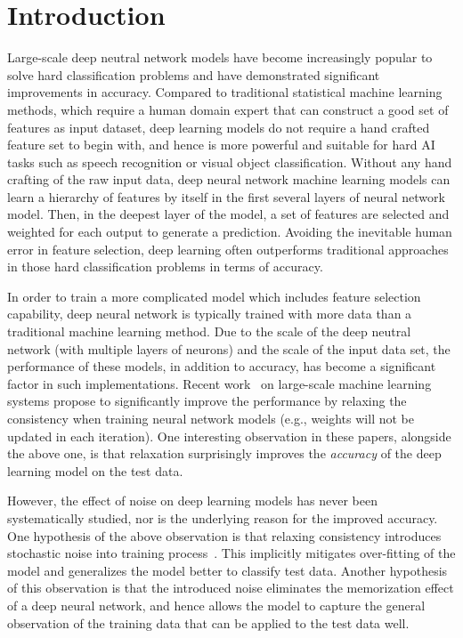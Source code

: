 \section{Introduction}
\label{sec:intro}

Large-scale deep neutral network models have become increasingly popular to
solve hard classification problems and have demonstrated significant
improvements in accuracy. Compared to traditional statistical machine learning
methods, which require a human domain expert that can construct a good set of
features as input dataset, deep learning models do not require a hand crafted
feature set to begin with, and hence is more powerful and suitable for hard AI
tasks such as speech recognition or visual object classification. Without any
hand crafting of the raw input data, deep neural network machine learning models
can learn a hierarchy of features by itself in the first several layers of
neural network model. Then, in the deepest layer of the model, a set of features
are selected and weighted for each output to generate a prediction. Avoiding the
inevitable human error in feature selection, deep learning often outperforms
traditional approaches in those hard classification problems in terms of
accuracy.

In order to train a more complicated model which includes feature selection
capability, deep neural network is typically trained with more data than a
traditional machine learning method. Due to the scale of the deep neutral
network (with multiple layers of neurons) and the scale of the input data set,
the performance of these models, in addition to accuracy, has become a
significant factor in such implementations. Recent
work~\cite{chilimbi14adam,wan2013dropconnect} on large-scale machine learning
systems propose to significantly improve the performance by relaxing the
consistency when training neural network models (e.g.,  weights will not be
updated in each iteration). One interesting observation in these papers,
alongside the above one, is that relaxation surprisingly improves the {\em
accuracy} of the deep learning model on the test data.

However, the effect of noise on deep learning models has never been
systematically studied, nor is the underlying reason for the improved accuracy.
One hypothesis of the above observation is that relaxing consistency introduces
stochastic noise into training process~\cite{chilimbi14adam}.  This implicitly
mitigates over-fitting of the model and generalizes the model better to classify
test data. Another hypothesis of this observation is that the introduced noise
eliminates the memorization effect of a deep neural network, and hence allows
the model to capture the general observation of the training data that can be
applied to the test data well.

